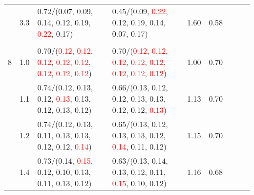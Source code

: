 \documentclass[10pt,a4paper]{report}
\begin{document}
\begin{table}[!htbp]
\begin{center}
{\begin{tabular}{ccllccccc}
				  & 3.3                               & 0.72/(\textcolor{black}{0.07}, 0.09, 0.14, 0.12, 0.19, \textcolor{red}{0.22}, 0.17)                                                                                                           & 0.45/(0.09, \textcolor{red}{0.22}, 0.12, 0.19, 0.14, \textcolor{black}{0.07}, 0.17)                                                                                                           & 1.60             & 0.58                     \\
				  &                                   &                                                                                                                                                                                               &                                                                                                                                                                                               &                                             \\
				8 & 1.0                               & 0.70/(\textcolor{red}{0.12}, \textcolor{red}{0.12}, \textcolor{red}{0.12}, \textcolor{red}{0.12}, \textcolor{red}{0.12}, \textcolor{red}{0.12}, \textcolor{red}{0.12}, \textcolor{red}{0.12}) & 0.70/(\textcolor{red}{0.12}, \textcolor{red}{0.12}, \textcolor{red}{0.12}, \textcolor{red}{0.12}, \textcolor{red}{0.12}, \textcolor{red}{0.12}, \textcolor{red}{0.12}, \textcolor{red}{0.12}) & 1.00             & 0.70                     \\
				  & 1.1                               & 0.74/(0.12, 0.13, 0.12, \textcolor{red}{0.13}, 0.13, \textcolor{black}{0.12}, 0.13, 0.12)                                                                                                     & 0.66/(0.13, 0.12, 0.12, 0.13, 0.13, 0.12, \textcolor{black}{0.12}, \textcolor{red}{0.13})                                                                                                     & 1.13             & 0.70                     \\
				  & 1.2                               & 0.74/(0.12, 0.13, \textcolor{black}{0.11}, 0.13, 0.13, 0.12, 0.12, \textcolor{red}{0.14})                                                                                                     & 0.65/(0.13, 0.12, 0.13, 0.13, 0.12, \textcolor{red}{0.14}, \textcolor{black}{0.11}, 0.12)                                                                                                     & 1.15             & 0.70                     \\
				  & 1.4                               & 0.73/(0.14, \textcolor{red}{0.15}, 0.12, \textcolor{black}{0.10}, 0.13, 0.11, 0.13, 0.12)                                                                                                     & 0.63/(0.13, 0.14, 0.13, 0.12, 0.11, \textcolor{red}{0.15}, \textcolor{black}{0.10}, 0.12)                                                                                                     & 1.16             & 0.68                     \\

\end{tabular}}
\end{center}
\end{table}
\end{document}
